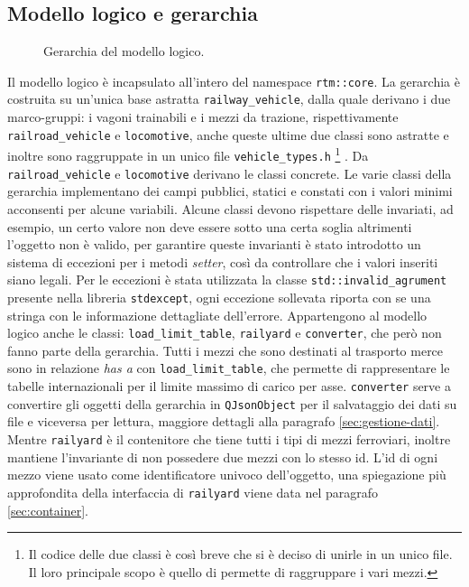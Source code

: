 \documentclass[a4paper,10pt]{article}
\begin{document}
\subsection {Modello logico e gerarchia}
%
\begin{figure}[htp]

\caption{Gerarchia del modello logico.}
\end{figure}
%
Il modello logico è incapsulato all'intero del namespace \texttt{rtm::core}. %
%
La gerarchia è costruita su un'unica base astratta \texttt{railway\_vehicle}, dalla quale derivano i due marco-gruppi: i vagoni trainabili e i mezzi da trazione, rispettivamente \texttt{railroad\_vehicle} e \texttt{locomotive}, anche queste ultime due classi sono astratte e inoltre sono raggruppate in un unico file \texttt{vehicle\_types.h}%
\footnote{Il codice delle due classi è così breve che si è deciso di unirle in un unico file. Il loro principale scopo è quello di permette di raggruppare i vari mezzi.}%
.
Da \texttt{railroad\_vehicle} e \texttt{locomotive} derivano le classi concrete. Le varie classi della gerarchia implementano dei campi pubblici, statici e constati con i valori minimi acconsenti per alcune variabili. Alcune classi devono rispettare delle invariati, ad esempio, un certo valore non deve essere sotto una certa soglia altrimenti l'oggetto non è valido, per garantire queste invarianti è stato introdotto un sistema di eccezioni per i metodi \emph{setter}, così da controllare che i valori inseriti siano legali. Per le eccezioni è stata utilizzata la classe \texttt{std::invalid\_agrument} presente nella libreria \texttt{stdexcept}, ogni eccezione sollevata riporta con se una stringa con le informazione dettagliate dell'errore.
Appartengono al modello logico anche le classi: \texttt{load\_limit\_table}, \texttt{railyard} e \texttt{converter}, che però non fanno parte della gerarchia. Tutti i mezzi che sono destinati al trasporto merce sono in relazione \emph{has a} con \texttt{load\_limit\_table}, che permette di rappresentare le tabelle internazionali per il limite massimo di carico per asse. \texttt{converter} serve a convertire gli oggetti della gerarchia in \texttt{QJsonObject} per il salvataggio dei dati su file e viceversa per lettura, maggiore dettagli alla paragrafo %
\ref{sec:gestione-dati}.
Mentre \texttt{railyard} è il contenitore che tiene tutti i tipi di mezzi ferroviari, inoltre mantiene l'invariante di non possedere due mezzi con lo stesso id. L'id di ogni mezzo viene usato come identificatore univoco dell'oggetto, una spiegazione più approfondita della interfaccia di \texttt{railyard} viene data nel paragrafo
\ref{sec:container}.
%
%
\end{document}
